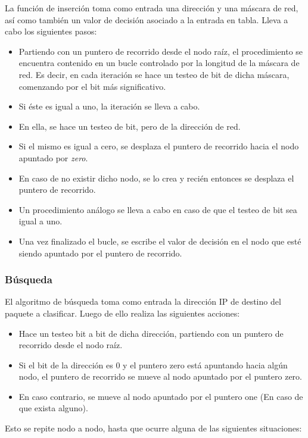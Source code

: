 La función de inserción toma como entrada una dirección y una máscara de red, así como también un valor de decisión asociado a la entrada en tabla. Lleva a cabo los siguientes pasos:
\begin{itemize}
	\item Partiendo con un puntero de recorrido desde el nodo raíz, el procedimiento se encuentra contenido en un bucle controlado por la longitud de la máscara de red. Es decir, en cada iteración se hace un testeo de bit de dicha máscara, comenzando por el bit más significativo. 
	\item Si éste es igual a uno, la iteración se lleva a cabo.
	\item En ella, se hace un testeo de bit, pero de la dirección de red.
	\item Si el mismo es igual a cero, se desplaza el puntero de recorrido hacia el nodo apuntado por \textit{zero}.
	\item En caso de no existir dicho nodo, se lo crea y recién entonces se desplaza el puntero de recorrido.
	\item Un procedimiento análogo se lleva a cabo en caso de que el testeo de bit sea igual a uno.
	\item Una vez finalizado el bucle, se escribe el valor de decisión en el nodo que esté siendo apuntado por el puntero de recorrido.
\end{itemize}

\subsubsection{Búsqueda}

El algoritmo de búsqueda toma como entrada la dirección IP de destino del paquete a clasificar. Luego de ello realiza las siguientes acciones:
\begin{itemize}
	\item Hace un testeo bit a bit de dicha dirección, partiendo con un puntero de recorrido desde el nodo raíz.
	\item Si el bit de la dirección es 0 y el puntero zero está apuntando hacia algún nodo, el puntero de recorrido se mueve al nodo apuntado por el puntero zero.
	\item En caso contrario, se mueve al nodo apuntado por el puntero one (En caso de que exista alguno).
\end{itemize}

Esto se repite nodo a nodo, hasta que ocurre alguna de las siguientes situaciones:

